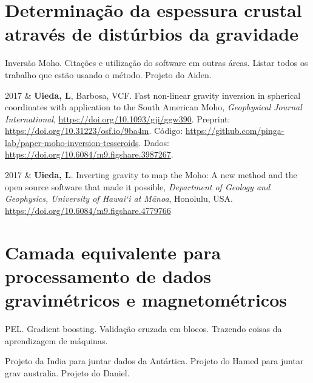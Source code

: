 \documentclass[10pt,a4paper,oneside]{book}
\newcommand{\UHM}{University of Hawai`i at M\={a}noa}
\newcommand{\Me}{\textbf{Uieda, L}}
\newcommand{\Val}{Barbosa, VCF}
\newcommand{\DOI}[1]{\url{https://doi.org/#1}}
\newcommand{\GitHub}[1]{\faGithub{} Código: \url{https://github.com/#1}}
\newcommand{\Data}[1]{\faChartBar{} Dados: \url{https://doi.org/#1}}
\newcommand{\Preprint}[1]{\faLockOpen{} Preprint: \url{https://doi.org/#1}}
\begin{document}
\section{Determinação da espessura crustal através de distúrbios da gravidade}

Inversão Moho. Citações e utilização do software em outras áreas.
Listar todos os trabalho que estão usando o método.
Projeto do Aiden.

\begin{subsummarybox}[frametitle=\faFilePdf{}\quad Artigos publicados]
  \begin{paperlist}
    2017 &
      \Me, \Val.
      Fast non-linear gravity inversion in spherical coordinates with application
      to the South American Moho,
      \emph{Geophysical Journal International},
      \DOI{10.1093/gji/ggw390}.
      \Preprint{10.31223/osf.io/9ba4m}.
      \GitHub{pinga-lab/paper-moho-inversion-tesseroids}.
      \Data{10.6084/m9.figshare.3987267}.
  \end{paperlist}
\end{subsummarybox}
\begin{subsummarybox}[frametitle=\faInfoCircle{}\quad Apresentações]
  \begin{paperlist}
    2017 &
      \Me.
      Inverting gravity to map the Moho: A new method and the open source
      software that made it possible,
      \emph{Department of Geology and Geophysics, \UHM},
      Honolulu, USA.
      \DOI{10.6084/m9.figshare.4779766}
  \end{paperlist}
\end{subsummarybox}


\section{Camada equivalente para processamento de dados gravimétricos e magnetométricos}

PEL.
Gradient boosting.
Validação cruzada em blocos.
Trazendo coisas da aprendizagem de máquinas.

Projeto da India para juntar dados da Antártica.
Projeto do Hamed para juntar grav australia.
Projeto do Daniel.
\end{document}
